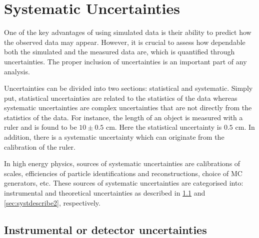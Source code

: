 \section{Systematic Uncertainties}
One of the key advantages of using simulated data is their ability to predict how the observed data may appear. 
However, it is crucial to assess how dependable both the simulated and the measured data are, which
is quantified through uncertainties. The proper inclusion of uncertainties is an important part of any analysis.

Uncertainties can be divided into two sections: statistical and systematic. Simply put, statistical uncertainties are
related to the statistics of the data whereas systematic uncertainties are complex uncertainties 
that are not directly from the statistics of the data. For instance, the length of an object is measured with a 
ruler and is found to be $10 \pm 0.5$ cm. Here the statistical uncertainty is $0.5$ cm. In addition,
there is a systematic uncertainty which can originate from the calibration of the ruler. 

In high energy physics, sources of systematic uncertainties are calibrations of scales, efficiencies of 
particle identifications and reconstructions, choice of MC generators, etc. These sources of systematic
uncertainties are categorised into: instrumental and theoretical uncertainties as described
in \cref{sec:systdescribe} and \cref{sec:systdescribe2}, respectively. 

\subsection{Instrumental or detector uncertainties}
\label{sec:systdescribe}

